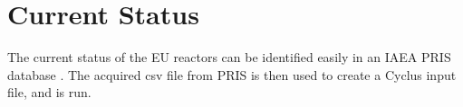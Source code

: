 \section{Current Status}
The current status of the EU reactors can be identified easily
in an \gls{IAEA} \gls{PRIS} database \cite{IAEA_PRIS_2017}.
The acquired csv file from \gls{PRIS} is then used to create a
Cyclus input file, and is run.

